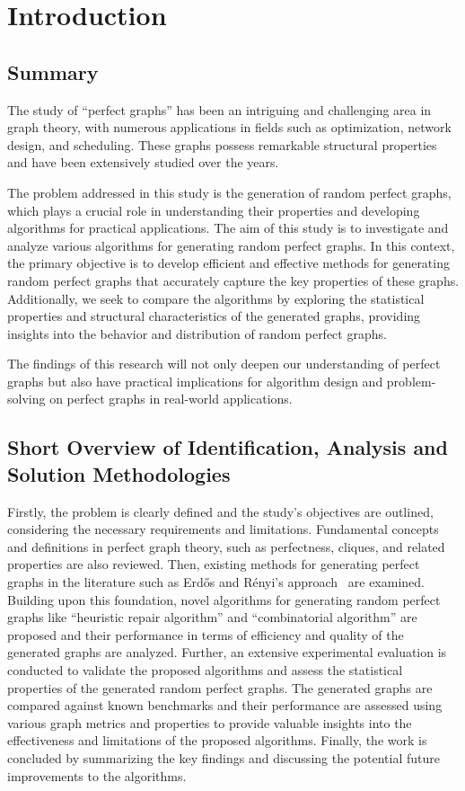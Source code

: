 \section{Introduction}

\subsection{Summary}

The study of ``perfect graphs'' has been an intriguing and challenging area in graph theory, with numerous applications in fields such as optimization, network design, and scheduling. These graphs possess remarkable structural properties and have been extensively studied over the years.

The problem addressed in this study is the generation of random perfect graphs, which plays a crucial role in understanding their properties and developing algorithms for practical applications. The aim of this study is to investigate and analyze various algorithms for generating random perfect graphs. In this context, the primary objective is to develop efficient and effective methods for generating random perfect graphs that accurately capture the key properties of these graphs. Additionally, we seek to compare the algorithms by exploring the statistical properties and structural characteristics of the generated graphs, providing insights into the behavior and distribution of random perfect graphs.

The findings of this research will not only deepen our understanding of perfect graphs but also have practical implications for algorithm design and problem-solving on perfect graphs in real-world applications.

\subsection{Short Overview of Identification, Analysis and Solution Methodologies}


Firstly, the problem is clearly defined and the study's objectives are outlined, considering the necessary requirements and limitations. Fundamental concepts and definitions in perfect graph theory, such as perfectness, cliques, and related properties are also reviewed. Then, existing methods for generating perfect graphs in the literature such as Erdős and Rényi's approach~\cite{erdos} are examined. Building upon this foundation, novel algorithms for generating random perfect graphs like ``heuristic repair algorithm'' and ``combinatorial algorithm'' are proposed and their performance in terms of efficiency and quality of the generated graphs are analyzed. Further, an extensive experimental evaluation is conducted to validate the proposed algorithms and assess the statistical properties of the generated random perfect graphs. The generated graphs are compared against known benchmarks and their performance are assessed using various graph metrics and properties to provide valuable insights into the effectiveness and limitations of the proposed algorithms. Finally, the work is concluded by summarizing the key findings and discussing the potential future improvements to the algorithms.

\newpage

\tableofcontents